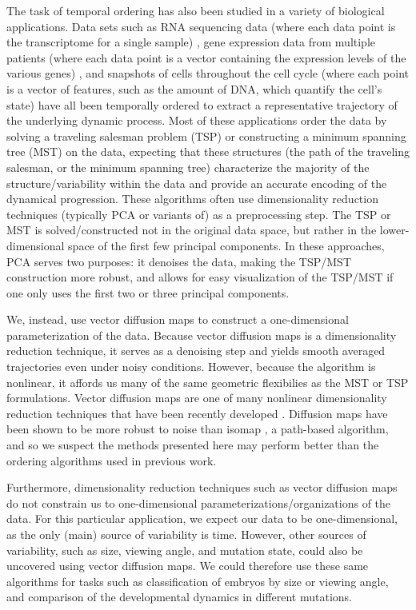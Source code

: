 \documentclass{pnastwo}
\begin{document}
\begin{article}
The task of temporal ordering has also been studied in a variety of biological applications. 
%
Data sets such as  RNA sequencing data (where each data point is the transcriptome for a single sample) \cite{anavy2014blind, trapnell2014dynamics}, gene expression data from multiple patients (where each data point is a vector containing the expression levels of the various genes) \cite{gupta2008extracting, qiu2011discovering}, and snapshots of cells throughout the cell cycle (where each point is a vector of features, such as the amount of DNA, which quantify the cell's state)  \cite{kafri2013dynamics} have all been temporally ordered to extract a representative trajectory of the underlying dynamic process.
%
Most of these applications order the data by solving a traveling salesman problem (TSP) or constructing a minimum spanning tree (MST) on the data,
expecting that these structures (the path of the traveling salesman, or the minimum spanning tree) characterize the majority of the structure/variability within the data and provide an accurate encoding of the dynamical progression.
%
These algorithms often use dimensionality reduction techniques (typically PCA or variants of) as a preprocessing step.
%
The TSP or MST is solved/constructed not in the original data space, but rather in the lower-dimensional space of the first few principal components.
%
In these approaches, PCA serves two purposes: it denoises the data, making the TSP/MST construction more robust, and allows for easy visualization of the TSP/MST if one only uses the first two or three principal components.

We, instead, use vector diffusion maps to construct a one-dimensional parameterization of the data.
%
Because vector diffusion maps is a dimensionality reduction technique, it serves as a denoising step and yields smooth averaged trajectories even under noisy conditions. 
%
However, because the algorithm is nonlinear, it affords us many of the same geometric flexibilies as the MST or TSP formulations. 
%
Vector diffusion maps are one of many nonlinear dimensionality reduction techniques that have been recently developed \cite{Belkin2003, tenenbaum2000global, Donoho2003, Roweis2000}.
%
Diffusion maps have been shown to be more robust to noise than isomap \cite{balasubramanian2002isomap}, a path-based algorithm, and so we suspect the methods presented here may perform better than the ordering algorithms used in previous work.

Furthermore, dimensionality reduction techniques such as vector diffusion maps do not constrain us to one-dimensional parameterizations/organizations of the data.
%
For this particular application, we expect our data to be one-dimensional, as the only (main) source of variability is time.
%
However, other sources of variability, such as size, viewing angle, and mutation state, could also be uncovered using vector diffusion maps.
%
We could therefore use these same algorithms for tasks such as classification of embryos by size or viewing angle, and comparison of the developmental dynamics in different mutations.


\end{article}
\end{document}
